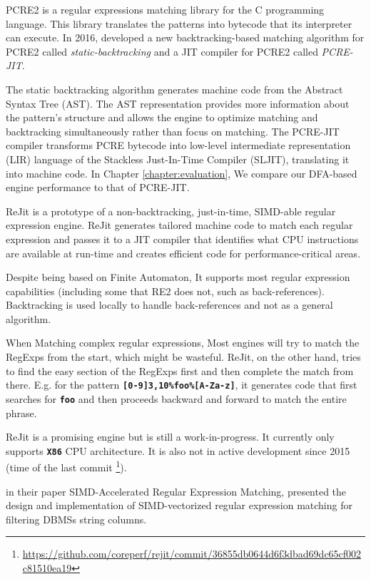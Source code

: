PCRE2 \cite{pcre2} is a regular expressions matching library for the C programming language. This library translates the patterns into bytecode that its interpreter can execute. In 2016, \citet{pcre2_jit} developed a new backtracking-based matching algorithm for PCRE2 called \textit{static-backtracking} and a JIT compiler for PCRE2 called \textit{PCRE-JIT}.

The static backtracking algorithm generates machine code from the Abstract Syntax Tree (AST). The AST representation provides more information about the pattern's structure and allows the engine to optimize matching and backtracking simultaneously rather than focus on matching. The PCRE-JIT compiler transforms PCRE bytecode into low-level intermediate representation (LIR) language of the Stackless Just-In-Time Compiler (SLJIT), translating it into machine code. In Chapter \ref{chapter:evaluation}, We compare our DFA-based engine performance to that of PCRE-JIT.

ReJit \cite{rejit} is a prototype of a non-backtracking, just-in-time, SIMD-able regular expression engine. ReJit generates tailored machine code to match each regular expression and passes it to a JIT compiler that identifies what CPU instructions are available at run-time and creates efficient code for performance-critical areas.

Despite being based on Finite Automaton, It supports most regular expression capabilities (including some that RE2 does not, such as back-references). Backtracking is used locally to handle back-references and not as a general algorithm.

When Matching complex regular expressions, Most engines will try to match the RegExps from the start, which might be wasteful. ReJit, on the other hand, tries to find the easy section of the RegExps first and then complete the match from there. E.g. for the pattern \texttt{\textbf{[0-9]{3,10}\%foo\%[A-Za-z]}}, it generates code that first searches for \texttt{\textbf{foo}} and then proceeds backward and forward to match the entire phrase.

ReJit is a promising engine but is still a work-in-progress. It currently only supports \texttt{\textbf{X86}} CPU architecture. It is also not in active development since 2015 (time of the last commit \footnote{\url{https://github.com/coreperf/rejit/commit/36855db0644d6f3dbad69dc65cf002c81510ea19}}).

\citet{simdregextpch} in their paper SIMD-Accelerated Regular Expression Matching, presented the design and implementation of SIMD-vectorized regular expression matching for filtering DBMSs string columns. 

